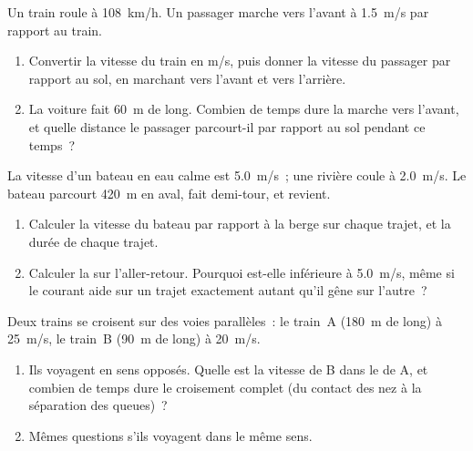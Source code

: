 \begin{exercise}[$\star\star$]\label{exo:g10:relative-motion:6}
Un train roule à \qty{108}{km/h}. Un passager marche vers l'avant à
\qty{1.5}{m/s} par rapport au train.
\begin{enumerate}
  \item Convertir la vitesse du train en \unit{m/s}, puis donner la
        vitesse du passager par rapport au sol, en marchant vers
        l'avant et vers l'arrière.
  \item La voiture fait \qty{60}{m} de long. Combien de temps dure la
        marche vers l'avant, et quelle distance le passager parcourt-il
        par rapport au sol pendant ce temps~?
\end{enumerate}
\end{exercise}

\begin{exercise}[$\star\star$]\label{exo:g10:relative-motion:7}
La vitesse d'un bateau en eau calme est \qty{5.0}{m/s}~; une rivière
coule à \qty{2.0}{m/s}. Le bateau parcourt \qty{420}{m} en aval, fait
demi-tour, et revient.
\begin{enumerate}
  \item Calculer la vitesse du bateau par rapport à la berge sur chaque
        trajet, et la durée de chaque trajet.
  \item Calculer la  sur l'aller-retour. Pourquoi
        est-elle inférieure à \qty{5.0}{m/s}, même si le courant aide
        sur un trajet exactement autant qu'il gêne sur l'autre~?
\end{enumerate}
\end{exercise}

\begin{exercise}[$\star\star$]\label{exo:g10:relative-motion:8}
Deux trains se croisent sur des voies parallèles~: le train~A
(\qty{180}{m} de long) à \qty{25}{m/s}, le train~B (\qty{90}{m} de
long) à \qty{20}{m/s}.
\begin{enumerate}
  \item Ils voyagent en sens opposés. Quelle est la vitesse de B dans
        le  de A, et combien de temps dure le croisement
        complet (du contact des nez à la séparation des queues)~?
  \item Mêmes questions s'ils voyagent dans le même sens.
\end{enumerate}
\end{exercise}

